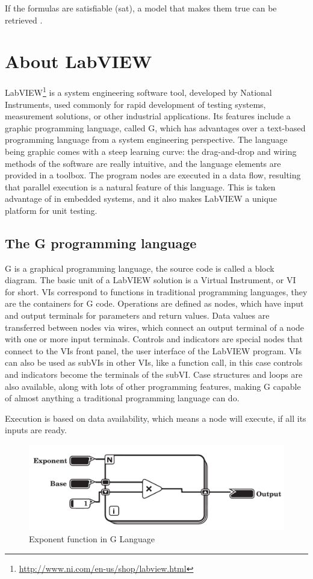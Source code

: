 If the formulas are satisfiable (sat), a model that makes them true can be retrieved \cite{z3_tutorial}. 
\section{About LabVIEW}
LabVIEW\footnote{\url{http://www.ni.com/en-us/shop/labview.html}} is a system engineering software tool, developed by National Instruments, used commonly for rapid development of testing systems, measurement solutions, or other industrial applications. Its features include a graphic programming language, called G, which has advantages over a text-based programming language from a system engineering perspective. The language being graphic comes with a steep learning curve: the drag-and-drop and wiring methods of the software are really intuitive, and the language elements are provided in a toolbox. The program nodes are executed in a data flow, resulting that parallel execution is a natural feature of this language. This is taken advantage of in embedded systems, and it also makes LabVIEW a unique platform for unit testing.
\subsection{The G programming language}
G is a graphical programming language, the source code is called a block diagram. The basic unit of a LabVIEW solution is a Virtual Instrument, or VI for short. VIs correspond to functions in traditional programming languages, they are the containers for G code. Operations are defined as nodes, which have input and output terminals for parameters and return values. Data values are transferred between nodes via wires, which connect an output terminal of a node with one or more input terminals. Controls and indicators are special nodes that connect to the VIs front panel, the user interface of the LabVIEW program. VIs can also be used as subVIs in other VIs, like a function call, in this case controls and indicators become the terminals of the subVI. Case structures and loops are also available, along with lots of other programming features, making G capable of almost anything a traditional programming language can do.

Execution is based on data availability, which means a node will execute, if all its inputs are ready. 
\begin{figure}

\includegraphics[width=150mm,keepaspectratio]{figures/vi2.pdf}
\caption{Exponent function in G Language} 
\label{fig:gexponent}
\end{figure}

